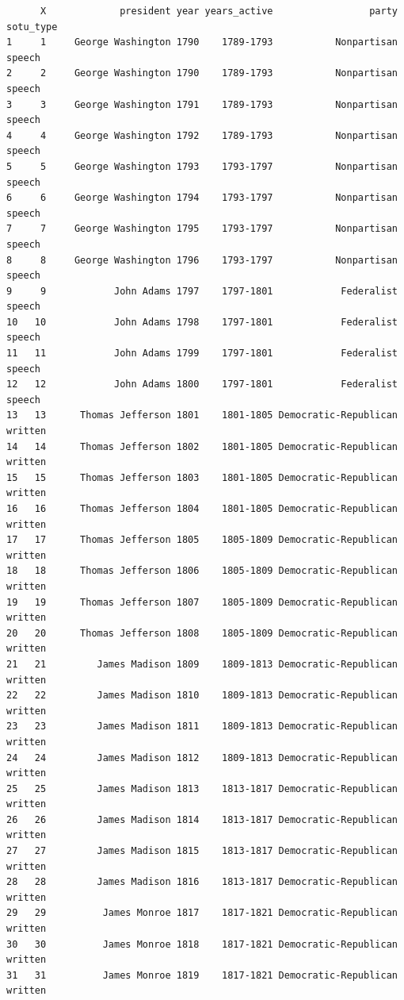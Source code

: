 \documentclass[
  letterpaper,
  DIV=11,
  numbers=noendperiod]{scrreprt}
\begin{document}
\begin{verbatim}
      X             president year years_active                 party sotu_type
1     1     George Washington 1790    1789-1793           Nonpartisan    speech
2     2     George Washington 1790    1789-1793           Nonpartisan    speech
3     3     George Washington 1791    1789-1793           Nonpartisan    speech
4     4     George Washington 1792    1789-1793           Nonpartisan    speech
5     5     George Washington 1793    1793-1797           Nonpartisan    speech
6     6     George Washington 1794    1793-1797           Nonpartisan    speech
7     7     George Washington 1795    1793-1797           Nonpartisan    speech
8     8     George Washington 1796    1793-1797           Nonpartisan    speech
9     9            John Adams 1797    1797-1801            Federalist    speech
10   10            John Adams 1798    1797-1801            Federalist    speech
11   11            John Adams 1799    1797-1801            Federalist    speech
12   12            John Adams 1800    1797-1801            Federalist    speech
13   13      Thomas Jefferson 1801    1801-1805 Democratic-Republican   written
14   14      Thomas Jefferson 1802    1801-1805 Democratic-Republican   written
15   15      Thomas Jefferson 1803    1801-1805 Democratic-Republican   written
16   16      Thomas Jefferson 1804    1801-1805 Democratic-Republican   written
17   17      Thomas Jefferson 1805    1805-1809 Democratic-Republican   written
18   18      Thomas Jefferson 1806    1805-1809 Democratic-Republican   written
19   19      Thomas Jefferson 1807    1805-1809 Democratic-Republican   written
20   20      Thomas Jefferson 1808    1805-1809 Democratic-Republican   written
21   21         James Madison 1809    1809-1813 Democratic-Republican   written
22   22         James Madison 1810    1809-1813 Democratic-Republican   written
23   23         James Madison 1811    1809-1813 Democratic-Republican   written
24   24         James Madison 1812    1809-1813 Democratic-Republican   written
25   25         James Madison 1813    1813-1817 Democratic-Republican   written
26   26         James Madison 1814    1813-1817 Democratic-Republican   written
27   27         James Madison 1815    1813-1817 Democratic-Republican   written
28   28         James Madison 1816    1813-1817 Democratic-Republican   written
29   29          James Monroe 1817    1817-1821 Democratic-Republican   written
30   30          James Monroe 1818    1817-1821 Democratic-Republican   written
31   31          James Monroe 1819    1817-1821 Democratic-Republican   written

\end{verbatim}
\end{document}
